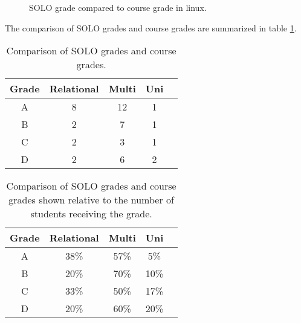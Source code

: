 \documentclass[twoside,twocolumn,a4paper,11pt,english]{article}
\begin{document}
\begin{figure}[H]
\caption{SOLO grade compared to course grade in linux.}
\label{figlinux}
\end{figure}

The comparison of SOLO grades and course grades are summarized in table \ref{table:sum}.

\begin{table}[H]
\caption{Comparison of SOLO grades and course grades.}
\centering
\begin{tabular}{c | c c c c}
Grade & Relational & Multi & Uni \\ [0.5ex] %
\hline
A & 8 & 12 & 1 \\
B & 2 & 7 & 1 \\
C & 2 & 3 & 1 \\
D & 2 & 6 & 2 \\ [1ex]
\end{tabular}
\label{table:sum}
\end{table}

\begin{table}[H]
\caption{Comparison of SOLO grades and course grades shown relative to the number of students receiving the grade.}
\centering
\begin{tabular}{c | c c c c}
Grade & Relational & Multi & Uni \\ [0.5ex] %
\hline
A & 38\% & 57\% & 5\% \\
B & 20\% & 70\% & 10\% \\
C & 33\% & 50\% & 17\% \\
D & 20\% & 60\% & 20\% \\ [1ex]
\end{tabular}
\label{table:percentage}
\end{table}
\end{document}
